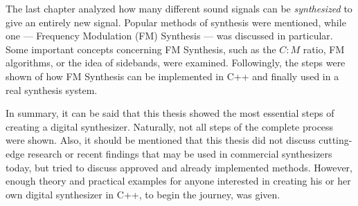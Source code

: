 The last chapter analyzed how many different sound signals can be \emph{synthesized} to give an entirely new signal. Popular methods of synthesis were mentioned, while one --- Frequency Modulation (FM) Synthesis --- was discussed in particular. Some important concepts concerning FM Synthesis, such as the $C:M$ ratio, FM algorithms, or the idea of sidebands, were examined. Followingly, the steps were shown of how FM Synthesis can be implemented in C++ and finally used in a real synthesis system. \vspace{\baselineskip}

\pagebreak

In summary, it can be said that this thesis showed the most essential steps of creating a digital synthesizer. Naturally, not all steps of the complete process were shown. Also, it should be mentioned that this thesis did not discuss cutting-edge research or recent findings that may be used in commercial synthesizers today, but tried to discuss approved and already implemented methods. However, enough theory and practical examples for anyone interested in creating his or her own digital synthesizer in C++, to begin the journey, was given.
